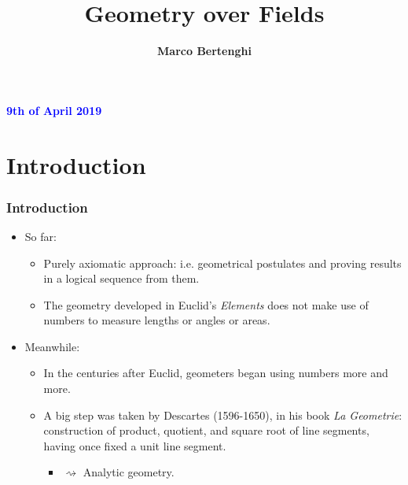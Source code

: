 \documentclass[compress,mathserif,serif]{beamer}
\title{Geometry over Fields}
\author[Marco Bertenghi]{\bf Marco Bertenghi}
\institute[UZH]{\bf University of Zurich}
\date{}
\begin{document}
\begin{frame}
\titlepage
\centerline{\textcolor{blue}{\bf 9th of April 2019}}
\vspace{0.5cm}
\end{frame}




\begin{frame}
\tableofcontents
\end{frame}

\section{Introduction}


\begin{frame}
\begin{center}
\Huge{}
\end{center}
\end{frame}




\begin{frame}
\frametitle{Introduction}

\begin{itemize}
\item So far: 
\pause
\begin{itemize}
\item Purely axiomatic approach: i.e. geometrical postulates and proving results in a logical sequence from them.
\pause
\item The geometry developed in Euclid's \textit{Elements} does not make use of numbers to measure lengths or angles or areas.
\end{itemize}
\pause
\item Meanwhile:
\pause
\begin{itemize}
\item In the centuries after Euclid, geometers began using numbers more and more.
\pause
\item A big step was taken by Descartes (1596-1650), in his book
\textit{La Geometrie}:
construction of product, quotient, and square root of line
segments, having once fixed a unit line segment.
\pause
\begin{itemize}
\item $\rightsquigarrow$ Analytic geometry.
\end{itemize}
\end{itemize}
\end{itemize}
\end{frame}
\end{document}
